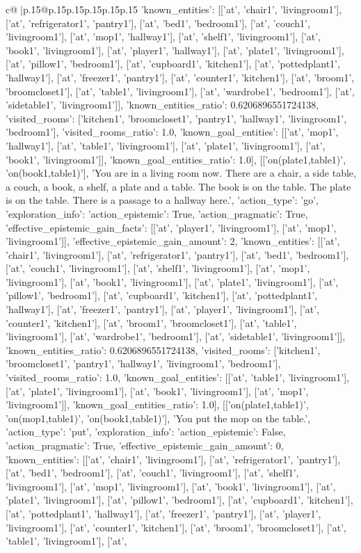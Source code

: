 \documentclass{article}
\begin{document}
{\begin{supertabular}{c@{$\;$}|p{.15\linewidth}@{}p{.15\linewidth}p{.15\linewidth}p{.15\linewidth}p{.15\linewidth}p{.15\linewidth}}
{{{'known_entities': [['at', 'chair1', 'livingroom1'], ['at', 'refrigerator1', 'pantry1'], ['at', 'bed1', 'bedroom1'], ['at', 'couch1', 'livingroom1'], ['at', 'mop1', 'hallway1'], ['at', 'shelf1', 'livingroom1'], ['at', 'book1', 'livingroom1'], ['at', 'player1', 'hallway1'], ['at', 'plate1', 'livingroom1'], ['at', 'pillow1', 'bedroom1'], ['at', 'cupboard1', 'kitchen1'], ['at', 'pottedplant1', 'hallway1'], ['at', 'freezer1', 'pantry1'], ['at', 'counter1', 'kitchen1'], ['at', 'broom1', 'broomcloset1'], ['at', 'table1', 'livingroom1'], ['at', 'wardrobe1', 'bedroom1'], ['at', 'sidetable1', 'livingroom1']], 'known_entities_ratio': 0.6206896551724138, 'visited_rooms': ['kitchen1', 'broomcloset1', 'pantry1', 'hallway1', 'livingroom1', 'bedroom1'], 'visited_rooms_ratio': 1.0, 'known_goal_entities': [['at', 'mop1', 'hallway1'], ['at', 'table1', 'livingroom1'], ['at', 'plate1', 'livingroom1'], ['at', 'book1', 'livingroom1']], 'known_goal_entities_ratio': 1.0}}], [['on(plate1,table1)', 'on(book1,table1)'], 'You are in a living room now. There are a chair, a side table, a couch, a book, a shelf, a plate and a table. The book is on the table. The plate is on the table. There is a passage to a hallway here.', {'action_type': 'go', 'exploration_info': {'action_epistemic': True, 'action_pragmatic': True, 'effective_epistemic_gain_facts': [['at', 'player1', 'livingroom1'], ['at', 'mop1', 'livingroom1']], 'effective_epistemic_gain_amount': 2, 'known_entities': [['at', 'chair1', 'livingroom1'], ['at', 'refrigerator1', 'pantry1'], ['at', 'bed1', 'bedroom1'], ['at', 'couch1', 'livingroom1'], ['at', 'shelf1', 'livingroom1'], ['at', 'mop1', 'livingroom1'], ['at', 'book1', 'livingroom1'], ['at', 'plate1', 'livingroom1'], ['at', 'pillow1', 'bedroom1'], ['at', 'cupboard1', 'kitchen1'], ['at', 'pottedplant1', 'hallway1'], ['at', 'freezer1', 'pantry1'], ['at', 'player1', 'livingroom1'], ['at', 'counter1', 'kitchen1'], ['at', 'broom1', 'broomcloset1'], ['at', 'table1', 'livingroom1'], ['at', 'wardrobe1', 'bedroom1'], ['at', 'sidetable1', 'livingroom1']], 'known_entities_ratio': 0.6206896551724138, 'visited_rooms': ['kitchen1', 'broomcloset1', 'pantry1', 'hallway1', 'livingroom1', 'bedroom1'], 'visited_rooms_ratio': 1.0, 'known_goal_entities': [['at', 'table1', 'livingroom1'], ['at', 'plate1', 'livingroom1'], ['at', 'book1', 'livingroom1'], ['at', 'mop1', 'livingroom1']], 'known_goal_entities_ratio': 1.0}}], [['on(plate1,table1)', 'on(mop1,table1)', 'on(book1,table1)'], 'You put the mop on the table.', {'action_type': 'put', 'exploration_info': {'action_epistemic': False, 'action_pragmatic': True, 'effective_epistemic_gain_amount': 0, 'known_entities': [['at', 'chair1', 'livingroom1'], ['at', 'refrigerator1', 'pantry1'], ['at', 'bed1', 'bedroom1'], ['at', 'couch1', 'livingroom1'], ['at', 'shelf1', 'livingroom1'], ['at', 'mop1', 'livingroom1'], ['at', 'book1', 'livingroom1'], ['at', 'plate1', 'livingroom1'], ['at', 'pillow1', 'bedroom1'], ['at', 'cupboard1', 'kitchen1'], ['at', 'pottedplant1', 'hallway1'], ['at', 'freezer1', 'pantry1'], ['at', 'player1', 'livingroom1'], ['at', 'counter1', 'kitchen1'], ['at', 'broom1', 'broomcloset1'], ['at', 'table1', 'livingroom1'], ['at', }}}
\end{supertabular}}
\end{document}
